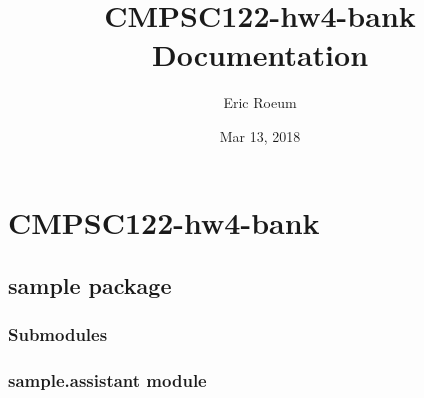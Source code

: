 \documentclass[letterpaper,10pt,english]{sphinxmanual}
\title{CMPSC122-hw4-bank Documentation}
\date{Mar 13, 2018}
\author{Eric Roeum}
\begin{document}
\maketitle
\sphinxtableofcontents
{}\label{\detokenize{index::doc}}



\chapter{CMPSC122-hw4-bank}
\label{\detokenize{modules:cmpsc122-hw4-bank}}\label{\detokenize{modules::doc}}\label{\detokenize{modules:welcome-to-cmpsc122-hw4-bank-s-documentation}}

\section{sample package}
\label{\detokenize{sample::doc}}\label{\detokenize{sample:sample-package}}

\subsection{Submodules}
\label{\detokenize{sample:submodules}}

\subsection{sample.assistant module}
\label{\detokenize{sample:module-sample.assistant}}\label{\detokenize{sample:sample-assistant-module}}
\end{document}
